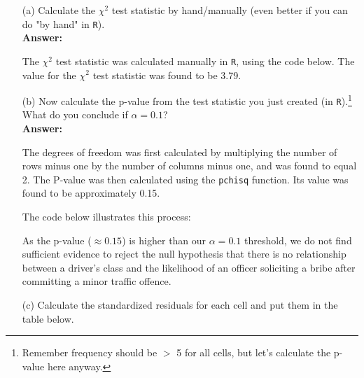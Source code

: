 \documentclass[12pt,letterpaper]{article}
\begin{document}
\begin{enumerate}
	
	\item [(a)]
	Calculate the $\chi^2$ test statistic by hand/manually (even better if you can do "by hand" in \texttt{R}).\\
	
	\textbf{Answer:}
	
	The $\chi^2$ test statistic was calculated manually in \texttt{R}, using the code below. The value for the $\chi^2$ test statistic was found to be 3.79.
	
	\vspace{.5cm}
	
	  
	
	\vspace{.5cm}
	
	\item [(b)]
	Now calculate the p-value from the test statistic you just created (in \texttt{R}).\footnote{Remember frequency should be $>$ 5 for all cells, but let's calculate the p-value here anyway.}  What do you conclude if $\alpha = 0.1$?\\
	
	\textbf{Answer:}
	
	The degrees of freedom was first calculated by multiplying the number of rows minus one by the number of columns minus one, and was found to equal 2. The P-value was then calculated using the \texttt{pchisq} function. Its value was found to be approximately 0.15.
	
	The code below illustrates this process:
	
	\vspace{.5cm}
	
	  
	
	\vspace{.5cm}
	
	As the p-value ($\approx 0.15$) is higher than our $\alpha = 0.1$ threshold, we do not find sufficient evidence to reject the null hypothesis that there is no relationship between a driver's class and the likelihood of an officer soliciting a bribe after committing a minor traffic offence.
	
	\newpage
	\item [(c)] Calculate the standardized residuals for each cell and put them in the table below.
	\vspace{0.5cm}
	

\end{enumerate}
\end{document}
